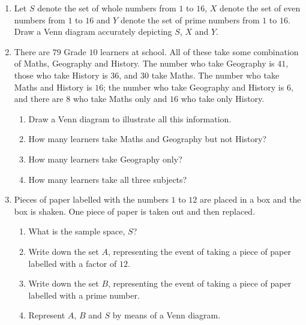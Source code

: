 \begin{exercises}{}
{
    \begin{enumerate}[itemsep=5pt, label=\textbf{\arabic*}. ]
   \item Let $S$ denote the set of whole numbers from $1$ to $16$, $X$
    denote the set of even numbers from $1$ to $16$ and $Y$ denote the
    set of prime numbers from $1$ to $16$. Draw a Venn diagram accurately depicting $S$, $X$ and $Y$.
\item
  There are $79$ Grade $10$ learners at school. All of these
    take some combination of Maths, Geography and History. The number who take
    Geography is $41$, those who take History is $36$, and $30$ take
    Maths. The number who take Maths and History is $16$; the number
    who take Geography and History is $6$, and there are $8$ who take
    Maths only and $16$ who take only History.
    \begin{enumerate}[noitemsep, label=\textbf{(\alph*)} ]
    \item Draw a Venn diagram to illustrate all this information.
    \item How many learners take Maths and Geography but not History?
    \item How many learners take Geography only?
    \item How many learners take all three subjects?
    \end{enumerate}
 \item Pieces of paper labelled with the numbers $1$ to $12$ are
    placed in a box and the box is shaken. One piece of paper is taken
    out and then replaced.
    \begin{enumerate}[noitemsep, label=\textbf{(\alph*)} ]
    \item What is the sample space, $S$?
    \item Write down the set $A$, representing the event of taking a
      piece of paper labelled with a factor of $12$.
    \item Write down the set $B$, representing the event of taking a
      piece of paper labelled with a prime number.
    \item Represent $A$, $B$ and $S$ by means of a Venn diagram.

\end{enumerate}
\end{enumerate}}
\end{exercises}
